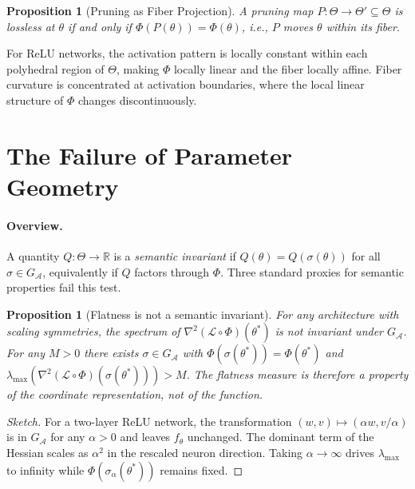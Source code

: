\documentclass[twocolumn,10pt]{article}
\theoremstyle{thmstyle}
\newtheorem{proposition}[theorem]{Proposition}
\theoremstyle{defstyle}
\begin{document}
\begin{proposition}[Pruning as Fiber Projection]
\label{prop:pruning-fiber}
A pruning map $P : \Theta \to \Theta' \subseteq \Theta$ is
\emph{lossless at $\theta$} if and only if $\Phi(P(\theta)) = \Phi(\theta)$,
i.e., $P$ moves $\theta$ within its fiber.
\end{proposition}

For ReLU networks, the activation pattern is locally constant within
each polyhedral region of $\Theta$, making $\Phi$ locally linear and
the fiber locally affine. Fiber curvature is concentrated at activation
boundaries, where the local linear structure of $\Phi$ changes
discontinuously.

\section{The Failure of Parameter Geometry}
\label{sec:failure}

\paragraph{Overview.}
A quantity $Q : \Theta \to \mathbb{R}$ is a \emph{semantic invariant}
if $Q(\theta) = Q(\sigma(\theta))$ for all $\sigma \in G_\mathcal{A}$,
equivalently if $Q$ factors through $\Phi$. Three standard proxies for
semantic properties fail this test.

\begin{proposition}[Flatness is not a semantic invariant]
For any architecture with scaling symmetries, the spectrum of
$\nabla^2(\mathcal{L}\circ\Phi)(\theta^*)$ is not invariant under
$G_\mathcal{A}$. For any $M > 0$ there exists $\sigma \in G_\mathcal{A}$
with $\Phi(\sigma(\theta^*)) = \Phi(\theta^*)$ and
$\lambda_{\max}(\nabla^2(\mathcal{L}\circ\Phi)(\sigma(\theta^*))) > M$.
The flatness measure is therefore a property of the coordinate
representation, not of the function.
\end{proposition}

\begin{proof}[Sketch]
For a two-layer ReLU network, the transformation
$(w, v) \mapsto (\alpha w, v/\alpha)$ is in $G_\mathcal{A}$ for any
$\alpha > 0$ and leaves $f_\theta$ unchanged. The dominant term of the
Hessian scales as $\alpha^2$ in the rescaled neuron direction. Taking
$\alpha \to \infty$ drives $\lambda_{\max}$ to infinity while
$\Phi(\sigma_\alpha(\theta^*))$ remains fixed.
\end{proof}
\end{document}
